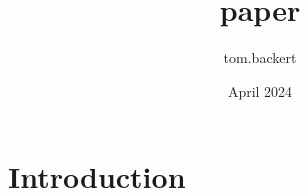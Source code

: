 \documentclass{article}
\title{paper}
\author{tom.backert }
\date{April 2024}
\begin{document}
\maketitle

\section{Introduction}
\end{document}
